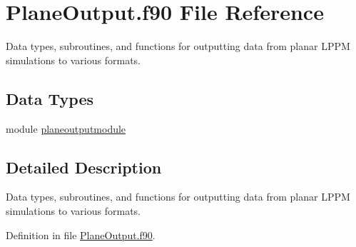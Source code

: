 \hypertarget{_plane_output_8f90}{\section{Plane\+Output.\+f90 File Reference}
\label{_plane_output_8f90}
}


Data types, subroutines, and functions for outputting data from planar L\+P\+P\+M simulations to various formats.  


\subsection*{Data Types}
\begin{DoxyCompactItemize}
\item 
module \hyperlink{classplaneoutputmodule}{planeoutputmodule}
\end{DoxyCompactItemize}


\subsection{Detailed Description}
Data types, subroutines, and functions for outputting data from planar L\+P\+P\+M simulations to various formats. 



Definition in file \hyperlink{_plane_output_8f90_source}{Plane\+Output.\+f90}.


